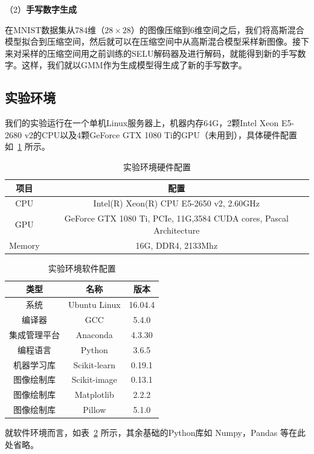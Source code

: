 \documentclass[UTF8]{ctexart}
\begin{document}
（2）\textbf{手写数字生成}

在MNIST数据集从784维（$28 \times 28$）的图像压缩到6维空间之后，我们将高斯混合模型拟合到压缩空间，然后就可以在压缩空间中从高斯混合模型采样新图像。接下来对采样的压缩空间用之前训练的SELU解码器及进行解码，就能得到新的手写数字。这样，我们就以GMM作为生成模型得生成了新的手写数字。

\subsection{实验环境}

我们的实验运行在一个单机Linux服务器上，机器内存64G，2颗Intel Xeon E5-2680 v2的CPU以及4颗GeForce GTX 1080 Ti的GPU（未用到），具体硬件配置如~\ref{tab:hard} 所示。

\begin{table}[!h]
  \centering
  \caption{实验环境硬件配置}\label{tab:hard}
  \begin{tabular}{cc}
    \toprule
    项目 & 配置 \\
    \midrule
    CPU & Intel(R) Xeon(R) CPU E5-2650 v2, 2.60GHz\\
    GPU & GeForce GTX 1080 Ti, PCIe, 11G,3584 CUDA cores, Pascal Architecture\\
    Memory & 16G, DDR4, 2133Mhz\\
    \bottomrule
  \end{tabular}
\end{table}
\begin{table}[!h]
  \centering
  \caption{实验环境软件配置}\label{tab:soft}
  \begin{tabular}{ccc}
    \toprule
    类型 & 名称 & 版本 \\
    \midrule
    系统 & Ubuntu Linux & 16.04.4\\
    编译器 & GCC & 5.4.0\\
    集成管理平台 & Anaconda & 4.3.30\\
    编程语言 & Python & 3.6.5\\
    机器学习库 & Scikit-learn & 0.19.1\\
    图像绘制库 & Scikit-image & 0.13.1\\
    图像绘制库 & Matplotlib & 2.2.2\\
    图像绘制库 & Pillow & 5.1.0\\
    \bottomrule
  \end{tabular}
\end{table}

就软件环境而言，如表~\ref{tab:soft} 所示，其余基础的Python库如 Numpy，Pandas 等在此处省略。
\end{document}

